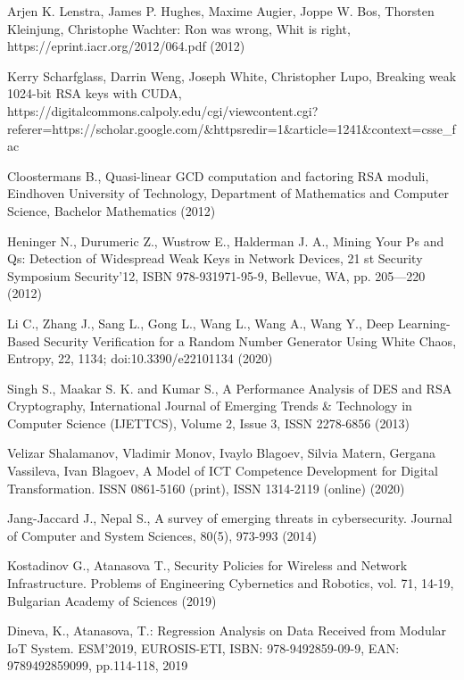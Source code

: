 \begin{thebibliography}{99.}

 Arjen K. Lenstra, James P. Hughes, Maxime Augier, Joppe W. Bos, Thorsten Kleinjung, Christophe Wachter: Ron was wrong, Whit is right, https://eprint.iacr.org/2012/064.pdf (2012)

 Kerry Scharfglass, Darrin Weng, Joseph White, Christopher Lupo, Breaking weak 1024-bit RSA keys with CUDA, https://digitalcommons.calpoly.edu/cgi/viewcontent.cgi? referer=https://scholar.google.com/\&httpsredir=1\&article=1241\&context=csse\_fac

 Cloostermans B., Quasi-linear GCD computation and factoring RSA moduli, Eindhoven University of Technology, Department of Mathematics and Computer Science, Bachelor Mathematics (2012)

 Heninger N., Durumeric Z., Wustrow E., Halderman J. A., Mining Your Ps and Qs: Detection of Widespread Weak Keys in Network Devices, 21 st Security Symposium Security’12, ISBN 978-931971-95-9, Bellevue, WA, pp. 205—220 (2012)

 Li C., Zhang J., Sang L., Gong L., Wang L., Wang A., Wang Y., Deep Learning- Based Security Verification for a Random Number Generator Using White Chaos, Entropy, 22, 1134; doi:10.3390/e22101134 (2020)

 Singh S., Maakar S. K. and Kumar S., A Performance Analysis of DES and RSA Cryptography, International Journal of Emerging Trends \& Technology in Computer Science (IJETTCS), Volume 2, Issue 3, ISSN 2278-6856 (2013)

 Velizar Shalamanov, Vladimir Monov, Ivaylo Blagoev, Silvia Matern, Gergana Vassileva, Ivan Blagoev, A Model of ICT Competence Development for Digital Transformation. ISSN 0861-5160 (print), ISSN 1314-2119 (online) (2020)

 Jang-Jaccard J., Nepal S., A survey of emerging threats in cybersecurity. Journal of Computer and System Sciences, 80(5), 973-993 (2014)

 Kostadinov G., Atanasova T., Security Policies for Wireless and Network Infrastructure. Problems of Engineering Cybernetics and Robotics, vol. 71, 14-19, Bulgarian Academy of Sciences (2019)

 Dineva, K., Atanasova, T.: Regression Analysis on Data Received from Modular IoT System. ESM’2019, EUROSIS-ETI, ISBN: 978-9492859-09-9, EAN: 9789492859099, pp.114-118, 2019


\end{thebibliography}
